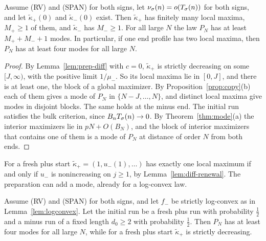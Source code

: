 \begin{theorem}\label{thm:modes-lower}
Assume (RV) and (SPAN) for both signs, let $\nu_\sigma(n)=o(T_\sigma(n))$ for both signs, and
let $\widetilde\kappa_\plus(0)$ and $\widetilde\kappa_\minus(0)$ exist. Then
$\widetilde\kappa_\plus$ has finitely many local maxima, $M_\plus\ge1$ of them, and
$\widetilde\kappa_\minus$ has $M_\minus\ge1$. For all large $N$ the law $P_N$ has at least
$M_\plus+M_\minus+1$ modes. In particular, if one end profile has two local maxima, then
$P_N$ has at least four modes for all large $N$.
\end{theorem}

\begin{proof}
By Lemma~\ref{lem:prep-diff} with $c=0$, $\widetilde\kappa_\plus$ is strictly decreasing on
some $[J,\infty)$, with the positive limit $1/\mu_\minus$. So its local maxima lie in
$[0,J]$, and there is at least one, the block of a global maximizer. By
Proposition~\ref{prop:copy}(b) each of them gives a mode of $P_N$ in
$\{N-J,\dots,N\}$, and distinct local maxima give modes in disjoint blocks. The same holds
at the minus end. The initial run satisfies the bulk criterion, since $B_nT_\sigma(n)\to0$.
By Theorem~\ref{thm:mode}(a) the interior maximizers lie in $pN+O(B_N)$, and the block of
interior maximizers that contains one of them is a mode of $P_N$ at distance of order $N$
from both ends.
\end{proof}

For a fresh plus start $\widetilde\kappa_\plus=(1,u_\minus(1),\dots)$ has exactly one local
maximum if and only if $u_\minus$ is nonincreasing on $j\ge1$, by
Lemma~\ref{lem:diff-renewal}. The preparation can add a mode, already for a log-convex law.

\begin{corollary}\label{cor:four-modes}
Assume (RV) and (SPAN) for both signs, and let $f_\minus$ be strictly log-convex as in
Lemma~\ref{lem:logconvex}. Let the initial run be a fresh plus run with probability
$\frac12$ and a minus run of a fixed length $d_0\ge2$ with probability $\frac12$. Then $P_N$
has at least four modes for all large $N$, while for a fresh plus start
$\widetilde\kappa_\plus$ is strictly decreasing.
\end{corollary}

